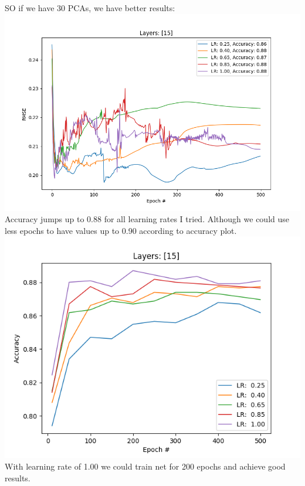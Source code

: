 \documentclass[12pt, letterpaper]{article}
\begin{document}
\begin{enumerate}[label=\Roman*.]
	    SO if we have 30 PCAs, we have better results:
	    {\center \includegraphics[scale=0.6]{../images/pca_rmse_130.png} \\}
	    Accuracy jumps up to 0.88  for all learning rates I tried. Although we could use less epochs to have values up to 0.90  according to accuracy plot.
	     {\center \includegraphics[scale=0.7]{../images/pca_accuracy_130.png} \\}
	     With learning rate of 1.00 we could train net for 200 epochs and achieve good results.
	     

\end{enumerate}
\end{document}
